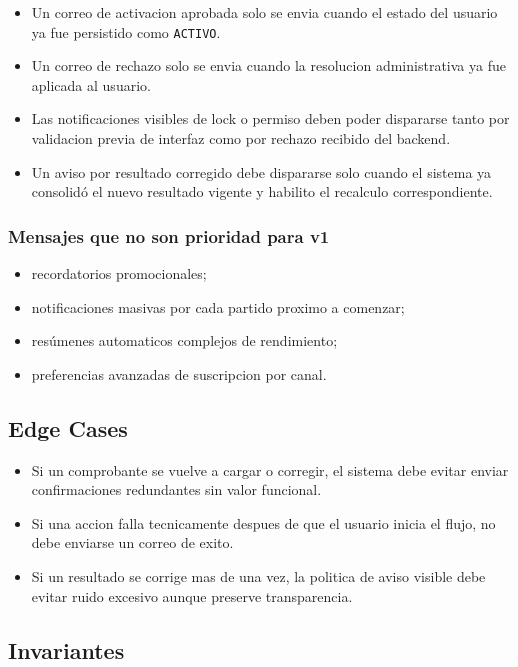 \begin{itemize}
  \item Un correo de activacion aprobada solo se envia cuando el estado del usuario ya fue persistido como \texttt{ACTIVO}.
  \item Un correo de rechazo solo se envia cuando la resolucion administrativa ya fue aplicada al usuario.
  \item Las notificaciones visibles de lock o permiso deben poder dispararse tanto por validacion previa de interfaz como por rechazo recibido del backend.
  \item Un aviso por resultado corregido debe dispararse solo cuando el sistema ya consolidó el nuevo resultado vigente y habilito el recalculo correspondiente.
\end{itemize}

\subsubsection{Mensajes que no son prioridad para v1}

\begin{itemize}
  \item recordatorios promocionales;
  \item notificaciones masivas por cada partido proximo a comenzar;
  \item resúmenes automaticos complejos de rendimiento;
  \item preferencias avanzadas de suscripcion por canal.
\end{itemize}

\subsection{Edge Cases}

\begin{itemize}
  \item Si un comprobante se vuelve a cargar o corregir, el sistema debe evitar enviar confirmaciones redundantes sin valor funcional.
  \item Si una accion falla tecnicamente despues de que el usuario inicia el flujo, no debe enviarse un correo de exito.
  \item Si un resultado se corrige mas de una vez, la politica de aviso visible debe evitar ruido excesivo aunque preserve transparencia.
\end{itemize}

\subsection{Invariantes}

